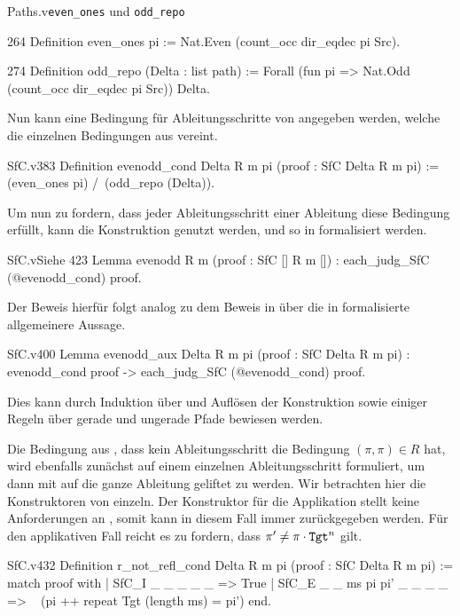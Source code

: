 \begin{multicode}{Paths.v}{}{\texttt{even\_ones} und \texttt{odd\_repo}}
    \begin{mcode}{264}
Definition even_ones pi := Nat.Even (count_occ dir_eqdec pi Src).
    \end{mcode}
    \begin{mcode}{274}
Definition odd_repo (Delta : list path) := 
    Forall (fun pi => Nat.Odd (count_occ dir_eqdec pi Src)) Delta.
    \end{mcode}
\end{multicode}

Nun kann eine Bedingung für Ableitungsschritte von  angegeben werden, welche die einzelnen Bedingungen aus  vereint.
\begin{code}{SfC.v}{}{383}
Definition evenodd_cond {Delta R m pi} (proof : SfC Delta R m pi) :=
    (even_ones pi) /\ (odd_repo (Delta)).
\end{code}
Um nun zu fordern, dass jeder Ableitungsschritt einer Ableitung diese Bedingung erfüllt, kann die Konstruktion  genutzt werden, und so  in  formalisiert werden.
\begin{code}[evenodd]{SfC.v}{Siehe }{423}
Lemma evenodd {R m} (proof : SfC [] R m []) : 
    each_judg_SfC (@evenodd_cond) proof.
\end{code}
Der Beweis hierfür folgt analog zu dem Beweis in  über die in  formalisierte allgemeinere Aussage.
\begin{code}{SfC.v}{}{400}
Lemma evenodd_aux {Delta R m pi} (proof : SfC Delta R m pi) : 
    evenodd_cond proof -> each_judg_SfC (@evenodd_cond) proof.
\end{code}
Dies kann durch Induktion über  und Auflösen der  Konstruktion sowie einiger Regeln über gerade und ungerade Pfade bewiesen werden.

Die Bedingung aus , dass kein Ableitungsschritt die Bedingung $(\pi,\pi)\in R$ hat, wird ebenfalls zunächst auf einem einzelnen Ableitungsschritt formuliert, um dann mit  auf die ganze Ableitung geliftet zu werden. Wir betrachten hier die Konstruktoren von  einzeln. Der Konstruktor für die Applikation stellt keine Anforderungen an , somit kann in diesem Fall immer  zurückgegeben werden. Für den applikativen Fall reicht es zu fordern, dass $\pi' \neq \pi\cdot\texttt{Tgt}^n$ gilt.
\begin{code}{SfC.v}{}{432}
Definition r_not_refl_cond {Delta R m pi} (proof : SfC Delta R m pi)  :=
  match proof with
  | SfC_I _ _ _ _ _ => True
  | SfC_E _ _ ms pi pi' _ _ _ _ => 
      ~ (pi ++ repeat Tgt (length ms) = pi')
  end.
\end{code}

